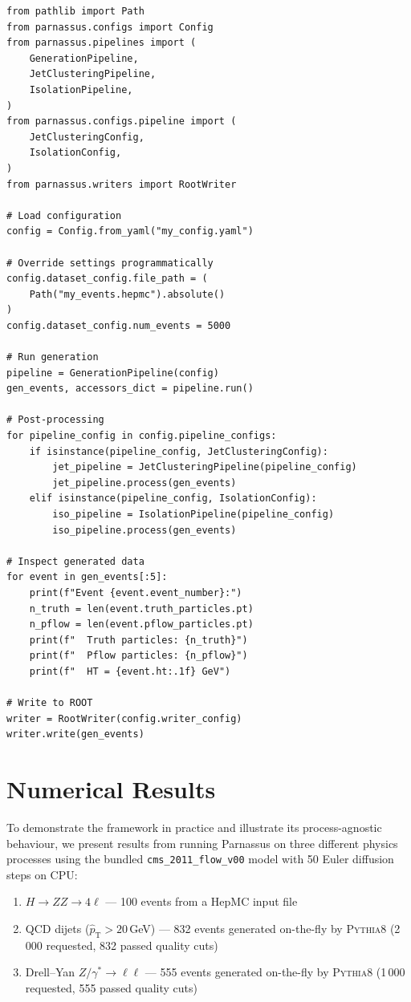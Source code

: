 \documentclass[11pt,a4paper]{article}
\begin{document}
\begin{lstlisting}[style=python,caption={Programmatic usage of the generation pipeline.}]
from pathlib import Path
from parnassus.configs import Config
from parnassus.pipelines import (
    GenerationPipeline,
    JetClusteringPipeline,
    IsolationPipeline,
)
from parnassus.configs.pipeline import (
    JetClusteringConfig,
    IsolationConfig,
)
from parnassus.writers import RootWriter

# Load configuration
config = Config.from_yaml("my_config.yaml")

# Override settings programmatically
config.dataset_config.file_path = (
    Path("my_events.hepmc").absolute()
)
config.dataset_config.num_events = 5000

# Run generation
pipeline = GenerationPipeline(config)
gen_events, accessors_dict = pipeline.run()

# Post-processing
for pipeline_config in config.pipeline_configs:
    if isinstance(pipeline_config, JetClusteringConfig):
        jet_pipeline = JetClusteringPipeline(pipeline_config)
        jet_pipeline.process(gen_events)
    elif isinstance(pipeline_config, IsolationConfig):
        iso_pipeline = IsolationPipeline(pipeline_config)
        iso_pipeline.process(gen_events)

# Inspect generated data
for event in gen_events[:5]:
    print(f"Event {event.event_number}:")
    n_truth = len(event.truth_particles.pt)
    n_pflow = len(event.pflow_particles.pt)
    print(f"  Truth particles: {n_truth}")
    print(f"  Pflow particles: {n_pflow}")
    print(f"  HT = {event.ht:.1f} GeV")

# Write to ROOT
writer = RootWriter(config.writer_config)
writer.write(gen_events)
\end{lstlisting}

\section{Numerical Results}
\label{sec:numerical}

To demonstrate the framework in practice and illustrate its process-agnostic
behaviour, we present results from running Parnassus on three different physics
processes using the bundled \texttt{cms\_2011\_flow\_v00} model with 50 Euler
diffusion steps on CPU:

\begin{enumerate}
  \item $H \to ZZ \to 4\ell$ --- 100 events from a HepMC input file
  \item QCD dijets ($\hat{p}_\mathrm{T} > 20$\,GeV) --- 832 events generated
    on-the-fly by \textsc{Pythia8} (2\,000 requested, 832 passed quality cuts)
  \item Drell--Yan $Z/\gamma^* \to \ell\ell$ --- 555 events generated on-the-fly
    by \textsc{Pythia8} (1\,000 requested, 555 passed quality cuts)
\end{enumerate}
\end{document}

